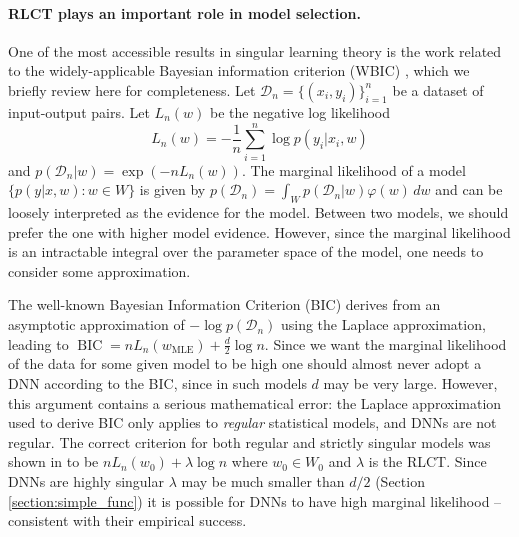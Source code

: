 \documentclass[11pt]{article}
\numberwithin{equation}{section}
\theoremstyle{plain}
\theoremstyle{definition}
\begin{document}
\paragraph{RLCT plays an important role in model selection.}
One of the most accessible results in singular learning theory is the work related to the widely-applicable Bayesian information criterion (WBIC) \citet{watanabe_widely_2013}, which we briefly review here for completeness.
Let $\mathcal D_n =  \{(x_i,y_i)\}_{i=1}^n$ be a dataset of input-output pairs.  
Let $L_n(w)$ be the negative log likelihood
\begin{equation}
	L_n(w) = -\frac{1}{n} \sum_{i=1}^n \log p(y_i |x_i, w)
	\label{eq:nll}
\end{equation}
and $p(\mathcal D_n | w) = \exp( -n L_n(w)).$
The marginal likelihood of a model $\{p(y|x,w): w \in W\}$ is given by
$
p(\mathcal D_n) = \int_W p(\mathcal D_n|w) \varphi(w) \,dw
$
and can be loosely interpreted as the evidence for the model. Between two models, we should prefer the one with higher model evidence. However, since the marginal likelihood is an intractable integral over the parameter space of the model, one needs to consider some approximation.

The well-known Bayesian Information Criterion (BIC) derives from an asymptotic approximation of $-\log p(\mathcal D_n)$ using the Laplace approximation, leading to
$
\operatorname{BIC} = nL_n( w_{\operatorname{MLE}}) + \frac{d}{2} \log n.
$
Since we want the marginal likelihood of the data for some given model to be high one should almost never adopt a DNN according to the BIC, since in such models $d$ may be very large. However, this argument contains a serious mathematical error: the Laplace approximation used to derive BIC only applies to \emph{regular} statistical models, and DNNs are not regular. 
The correct criterion for both regular and strictly singular models was shown in \citet{watanabe_widely_2013} to be $nL_n(w_0) + \lambda \log n$ where $w_0 \in W_0$ and $\lambda$ is the RLCT. Since DNNs are highly singular $\lambda$ may be much smaller than $d/2$ (Section \ref{section:simple_func}) it is possible for DNNs to have high marginal likelihood -- consistent with their empirical success. 
\end{document}
